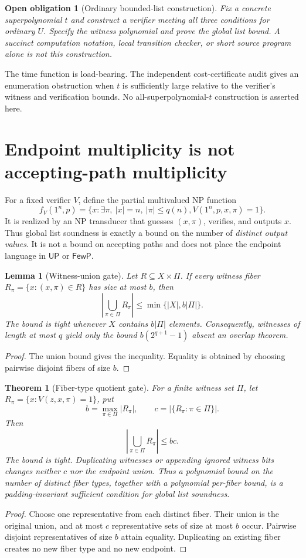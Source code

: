 \documentclass[11pt]{article}
\newtheorem{theorem}{Theorem}
\newtheorem{lemma}{Lemma}
\newtheorem{obligation}{Open obligation}
\begin{document}
\begin{obligation}[Ordinary bounded-list construction]
Fix a concrete superpolynomial $t$ and construct a verifier meeting all
three conditions for ordinary $U$. Specify the witness polynomial and
prove the global list bound. A succinct computation notation, local
transition checker, or short source program alone is not this construction.
\end{obligation}
The time function is load-bearing. The independent cost-certificate
audit gives an enumeration obstruction when $t$ is sufficiently large
relative to the verifier's witness and verification bounds. No
all-superpolynomial-$t$ construction is asserted here.

\section{Endpoint multiplicity is not accepting-path multiplicity}
For a fixed verifier $V$, define the partial multivalued NP function
\[
 f_V(1^n,p)=\{x:\exists\pi,\ |x|=n,\ |\pi|\le q(n),
                       V(1^n,p,x,\pi)=1\}.
\]
It is realized by an NP transducer that guesses $(x,\pi)$, verifies,
and outputs $x$. Thus global list soundness is exactly a bound on the
number of \emph{distinct output values}. It is not a bound on accepting
paths and does not place the endpoint language in $\mathsf{UP}$ or
$\mathsf{FewP}$.

\begin{lemma}[Witness-union gate]
Let $R\subseteq X\times\Pi$. If every witness fiber
$R_\pi=\{x:(x,\pi)\in R\}$ has size at most $b$, then
\[
 \left|\bigcup_{\pi\in\Pi}R_\pi\right|
 \le \min\{|X|,b|\Pi|\}.
\]
The bound is tight whenever $X$ contains $b|\Pi|$ elements.
Consequently, witnesses of length at most $q$ yield only the bound
$b(2^{q+1}-1)$ absent an overlap theorem.
\end{lemma}
\begin{proof}
The union bound gives the inequality. Equality is obtained by choosing
pairwise disjoint fibers of size $b$.
\end{proof}

\begin{theorem}[Fiber-type quotient gate]
For a finite witness set $\Pi$, let
\(R_\pi=\{x:V(z,x,\pi)=1\}\), put
\[
 b=\max_{\pi\in\Pi}|R_\pi|,
 \qquad
 c=\bigl|\{R_\pi:\pi\in\Pi\}\bigr|.
\]
Then
\[
 \left|\bigcup_{\pi\in\Pi}R_\pi\right|\le bc.
\]
The bound is tight.  Duplicating witnesses or appending ignored witness
bits changes neither $c$ nor the endpoint union.  Thus a polynomial bound
on the number of distinct fiber types, together with a polynomial
per-fiber bound, is a padding-invariant sufficient condition for global
list soundness.
\end{theorem}
\begin{proof}
Choose one representative from each distinct fiber.  Their union is the
original union, and at most $c$ representative sets of size at most $b$
occur.  Pairwise disjoint representatives of size $b$ attain equality.
Duplicating an existing fiber creates no new fiber type and no new endpoint.
\end{proof}
\end{document}
